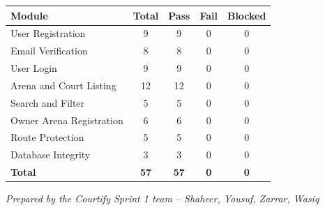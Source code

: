\documentclass[12pt,a4paper]{article}
\begin{document}
\renewcommand{\arraystretch}{1.4}
\begin{tabularx}{\textwidth}{|X|c|c|c|c|}
\hline
\rowcolor{headerbg}
\color{white}\bfseries Module & \color{white}\bfseries Total & \color{white}\bfseries Pass & \color{white}\bfseries Fail & \color{white}\bfseries Blocked \\
\hline
User Registration       & 9  & 9  & 0 & 0 \\ \hline
\rowcolor{rowgray}
Email Verification      & 8  & 8  & 0 & 0 \\ \hline
User Login              & 9  & 9  & 0 & 0 \\ \hline
\rowcolor{rowgray}
Arena and Court Listing & 12 & 12 & 0 & 0 \\ \hline
Search and Filter       & 5  & 5  & 0 & 0 \\ \hline
\rowcolor{rowgray}
Owner Arena Registration & 6 & 6  & 0 & 0 \\ \hline
Route Protection        & 5  & 5  & 0 & 0 \\ \hline
\rowcolor{rowgray}
Database Integrity      & 3  & 3  & 0 & 0 \\ \hline
\rowcolor{headerbg}
\color{white}\bfseries Total & \color{white}\bfseries 57 & \color{white}\bfseries 57 & \color{white}\bfseries 0 & \color{white}\bfseries 0 \\ \hline
\end{tabularx}

\vspace{2cm}
\begin{center}
\textit{Prepared by the Courtify Sprint 1 team -- Shaheer, Yousuf, Zarrar, Wasiq}
\end{center}
\end{document}
